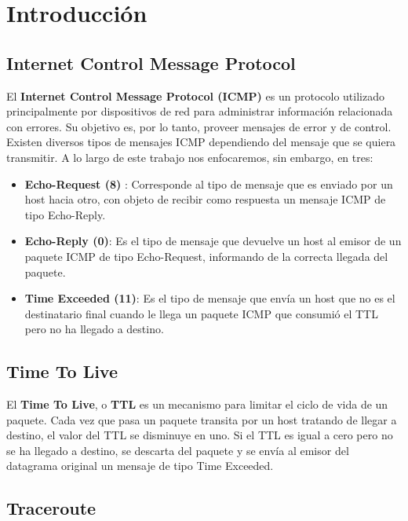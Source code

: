 \section{Introducción}

\subsection{Internet Control Message Protocol}

\indent \indent El \textbf{Internet Control Message Protocol (ICMP)} es un protocolo utilizado principalmente por dispositivos de red para administrar información relacionada con errores. Su objetivo es, por lo tanto, proveer mensajes de error y de control.\\
\indent Existen diversos tipos de mensajes ICMP dependiendo del mensaje que se quiera transmitir. A lo largo de este trabajo nos enfocaremos, sin embargo, en tres: \\
\begin{itemize}
\item \textbf{Echo-Request (8)} : Corresponde al tipo de mensaje que es enviado por un host hacia otro, con objeto de recibir como respuesta un mensaje ICMP de tipo Echo-Reply.
\item \textbf{Echo-Reply (0)}: Es el tipo de mensaje que devuelve un host al emisor de un paquete ICMP de tipo Echo-Request, informando de la correcta llegada del paquete.
\item \textbf{Time Exceeded (11)}: Es el tipo de mensaje que envía un host que no es el destinatario final cuando le llega un paquete ICMP que consumió el TTL pero no ha llegado a destino.
\end{itemize}

\subsection{Time To Live}

\indent \indent El \textbf{Time To Live}, o \textbf{TTL} es un mecanismo para limitar el ciclo de vida de un paquete. Cada vez que pasa un paquete transita por un host tratando de llegar a destino, el valor del TTL se disminuye en uno. Si el TTL es igual a cero pero no se ha llegado a destino, se descarta del paquete y se envía al emisor del datagrama original un mensaje de tipo Time Exceeded.\\

\subsection{Traceroute}

